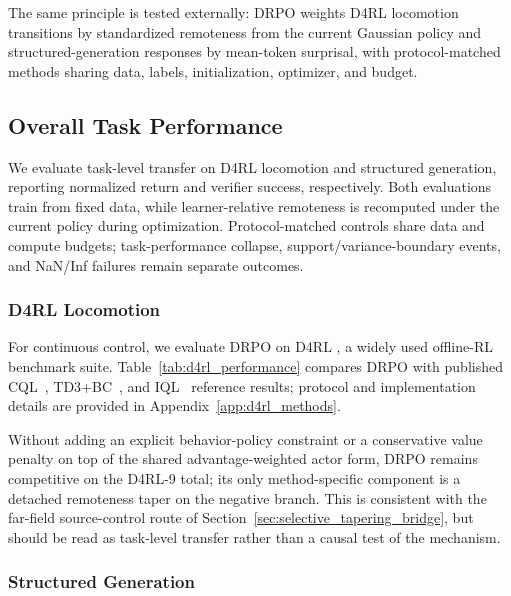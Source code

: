 \documentclass{article}
\theoremstyle{plain}
\theoremstyle{definition}
\theoremstyle{remark}
\begin{document}
The same principle is tested externally: DRPO weights D4RL locomotion transitions by
standardized remoteness from the current Gaussian policy and structured-generation
responses by mean-token surprisal, with protocol-matched methods sharing
data, labels, initialization, optimizer, and budget.

\subsection{Overall Task Performance}
\label{sec:overall_performance}

We evaluate task-level transfer on D4RL locomotion and structured generation,
reporting normalized return and verifier success, respectively.
Both evaluations train from fixed data, while learner-relative remoteness is
recomputed under the current policy during optimization. Protocol-matched
controls share data and compute budgets; task-performance collapse,
support/variance-boundary events, and NaN/Inf failures remain separate outcomes.


\subsubsection{D4RL Locomotion}
\label{sec:d4rl_performance}

For continuous control, we evaluate DRPO on D4RL
\citep{fu2020d4rl}, a widely used offline-RL benchmark suite.
Table~\ref{tab:d4rl_performance} compares DRPO with published
CQL~\citep{kumar2020conservative}, TD3+BC~\citep{fujimoto2021minimalist},
and IQL~\citep{kostrikov2021offline} reference results; protocol and
implementation details are provided in Appendix~\ref{app:d4rl_methods}.

Without adding an explicit behavior-policy constraint or a conservative
value penalty on top of the shared advantage-weighted actor form, DRPO
remains competitive on the D4RL-9 total; its only method-specific
component is a detached remoteness taper on the negative branch. This is
consistent with the far-field source-control route of
Section~\ref{sec:selective_tapering_bridge}, but should be read as
task-level transfer rather than a causal test of the mechanism.

\subsubsection{Structured Generation}
\label{sec:structured_generation_performance}
\end{document}
